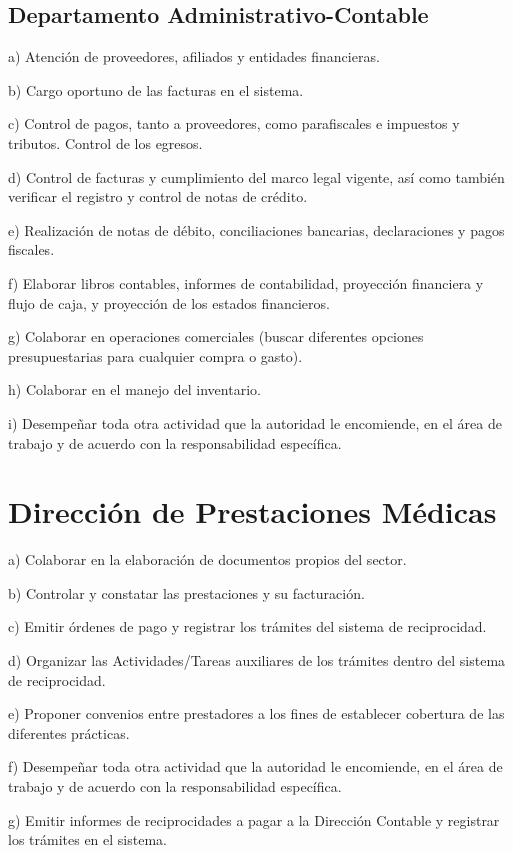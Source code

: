 \subsection{Departamento Administrativo-Contable}
\begin{displayquote}
a) Atención de proveedores, afiliados y entidades financieras.

b) Cargo oportuno de las facturas en el sistema.

c) Control de pagos, tanto a proveedores, como parafiscales e impuestos y tributos. Control de los egresos.

d) Control de facturas y cumplimiento del marco legal vigente, así como también verificar el registro y control de notas de crédito.

e) Realización de notas de débito, conciliaciones bancarias, declaraciones y pagos fiscales.

f) Elaborar libros contables, informes de contabilidad, proyección financiera y flujo de caja, y proyección de los estados financieros.

g) Colaborar en operaciones comerciales (buscar diferentes opciones presupuestarias para cualquier compra o gasto).

h) Colaborar en el manejo del inventario.

i) Desempeñar toda otra actividad que la autoridad le encomiende, en el área de trabajo y de acuerdo con la responsabilidad específica.
\hfill\parencite{CSOrd17}
\end{displayquote}

\section{Dirección de Prestaciones Médicas}
\begin{displayquote}
a) Colaborar en la elaboración de documentos propios del sector.

b) Controlar y constatar las prestaciones y su facturación.

c) Emitir órdenes de pago y registrar los trámites del sistema de reciprocidad.

d) Organizar las Actividades/Tareas auxiliares de los trámites dentro del sistema de reciprocidad.

e) Proponer convenios entre prestadores a los fines de establecer cobertura de las diferentes prácticas.

f) Desempeñar toda otra actividad que la autoridad le encomiende, en el área de trabajo y de acuerdo con la responsabilidad específica.

g) Emitir informes de reciprocidades a pagar a la Dirección Contable y registrar los trámites en el sistema.
\hfill\parencite{CSOrd17}
\end{displayquote}

